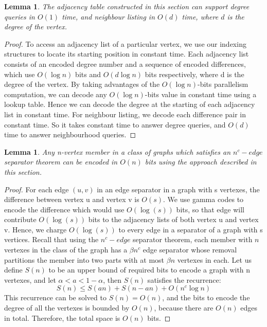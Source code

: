\documentclass[12pt,glossary]{dalthesis}
\newtheorem{lemma}[theorem]{Lemma}
\begin{document}
\bigskip
\begin{lemma}
The adjacency table constructed in this section can support degree queries in $O(1)$ time, and neighbour
listing in $O(d)$ time, where $d$ is the degree of the vertex.
\end{lemma}
\bigskip 
\begin{proof}
To access an adjacency list of a particular vertex, we use our indexing structures to locate its starting position in constant time. Each adjacency list consists of an encoded degree number and a sequence of encoded differences, which use $O(\log n)$ bits and $O(d\log n)$ bits respectively, where d is the degree of the vertex. By taking advantages of the $O(\log n)$-bits parallelism computation, we can decode any $O(\log n)$-bits value in constant time using a lookup table. Hence we can decode the degree at the starting of each adjacency list in constant time. For neighbour listing, we decode each difference pair in constant time. So it takes constant time to answer degree queries, and $O(d)$ time to answer neighbourhood queries.
\end{proof}

\bigskip
\begin{lemma}
Any n-vertex member in a class of graphs which satisfies an $n^{c}-edge$ separator
theorem can be encoded in $O(n)$ bits using the approach described in this section.
\end{lemma}

\bigskip
\begin{proof}
For each edge $(u, v)$ in an edge separator in a graph with s vertexes, the difference
between vertex u and vertex v is $O(s)$. We use gamma codes to encode the difference which would use $O(\log (s))$ bits, so that edge will contribute $O(\log (s))$ bits to the adjacency lists of both vertex u and vertex v. Hence, we charge $O(\log (s))$ to every edge in a separator of a graph with s vertices. Recall that using the $n^{c}- edge$ separator theorem, each member with $n$ vertexes in the class of the graph has a $\beta n^{c}$ edge separator whose removal partitions the member into two parts with at most $\beta n$ vertexes in each. Let us define $S(n)$ to be an upper bound of required bits to encode a graph with n vertexes, and let $\alpha < a < 1 - \alpha $, then $S(n)$ satisfies the recurrence:
\[ S(n) \leq S(an) + S(n-an) + O(n^{c} \log n) \]
This recurrence can be solved to $S(n) = O(n)$, and the bits to encode the degree of all the vertexes is bounded by $O(n)$, because there are $O(n)$ edges in total. Therefore, the total space is $O(n)$ bits.
\end{proof}
\end{document}

